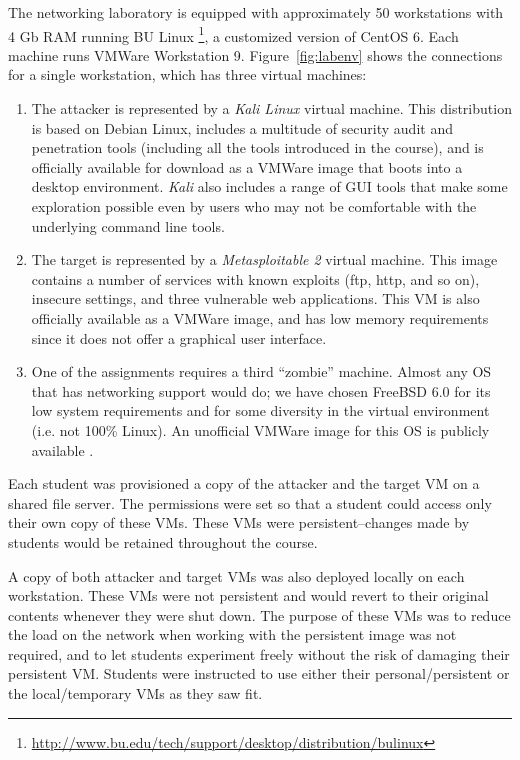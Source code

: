 \documentclass{sig-alternate-2013}
\begin{document}
The networking laboratory is equipped with approximately 50 workstations with 4 Gb RAM running 
BU Linux \footnote{\url{http://www.bu.edu/tech/support/desktop/distribution/bulinux}}, 
a customized version of CentOS 6. Each machine runs VMWare Workstation 9.
Figure~\ref{fig:labenv} shows the connections for a single workstation, which has three virtual machines:

\begin{enumerate}
\item The attacker is represented by a \emph{Kali Linux} \cite{kali} virtual machine. This distribution is based
on Debian Linux, includes a multitude of security audit and penetration tools (including all the tools introduced
in the course), and is officially available for download as a VMWare image that boots into a desktop environment.
\emph{Kali} also includes a range of GUI tools that make some exploration possible even by users who may
not be comfortable with the underlying command line tools.
\item The target is represented by a \emph{Metasploitable 2} \cite{metavm} virtual machine. This image contains
a number of services with known exploits (ftp, http, and so on), insecure settings, and three vulnerable web 
applications. This VM is also officially available as a VMWare image, and has low memory requirements since it does
not offer a graphical user interface.
\item One of the assignments requires a third ``zombie'' machine. Almost any OS that has networking
support would do; we have chosen FreeBSD 6.0 for its low system requirements and for some diversity
in the virtual environment (i.e. not 100\% Linux). An unofficial VMWare image for this OS is publicly available \cite{tpolice}.
\end{enumerate}

Each student was provisioned a copy of the attacker and the target VM on a shared file server. The permissions
were set so that a student could access only their own copy of these VMs. These VMs were persistent--changes
made by students would be retained throughout the course.

A copy of both attacker and target VMs was also deployed locally on each workstation. These VMs were not 
persistent and would revert to their original contents whenever they were shut down. The purpose of these
VMs was to reduce the load on the network when working with the persistent image was not required, and to let
students experiment freely  without the risk of damaging their persistent VM. Students were instructed to use 
either their personal/persistent or the local/temporary VMs as they saw fit. 
\end{document}
